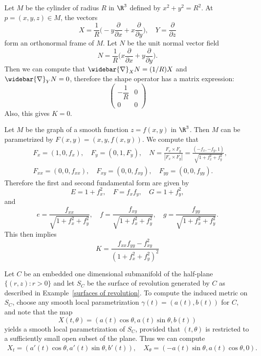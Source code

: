 \begin{example}
Let $M$ be the cylinder of radius $R$ in $\R^3$ defined by $x^2+y^2=R^2$. At $p=(x,y,z)\in M$, the vectors
\[X=\frac{1}{R}\Big(-y\frac{\partial}{\partial x}+x\frac{\partial}{\partial y}\Big),\quad Y=\frac{\partial}{\partial z}\]
form an orthonormal frame of $M$. Let $N$ be the unit normal vector field 
\[N=\frac{1}{R}\Big(x\frac{\partial}{\partial x}+y\frac{\partial}{\partial y}\Big).\]
Then we can compute that $\widebar{\nabla}_XN=(1/R)X$ and $\widebar{\nabla}_YN=0$, therefore the shape operator has a matrix expression:
\[\begin{pmatrix}
-\dfrac{1}{R}&0\\[4pt]
0&0
\end{pmatrix}\]
Also, this gives $K=0$.
\end{example}
\begin{example}
Let $M$ be the graph of a smooth function $z=f(x,y)$ in $\R^3$. Then $M$ can be parametrized by $F(x,y)=(x,y,f(x,y))$. We compute that
\begin{align*}
&F_{x}=(1,0,f_x),\quad F_y=(0,1,F_y),\quad N=\frac{F_x\times F_y}{|F_x\times F_y|}=\frac{(-f_x,-f_y,1)}{\sqrt{1+f_x^2+f_y^2}},\\
&F_{xx}=(0,0,f_{xx}),\quad F_{xy}=(0,0,f_{xy}),\quad F_{yy}=(0,0,f_{yy}).
\end{align*}
Therefore the first and second fundamental form are given by
\[E=1+f_x^2,\quad F=f_xf_y,\quad G=1+f_y^2,\]
and
\[e=\frac{f_{xx}}{\sqrt{1+f_x^2+f_y^2}},\quad f=\frac{f_{xy}}{\sqrt{1+f_x^2+f_y^2}},\quad g=\frac{f_{yy}}{\sqrt{1+f_x^2+f_y^2}}.\]
This then implies
\[K=\frac{f_{xx}f_{yy}-f_{xy}^2}{(1+f_x^2+f_y^2)^2}\]
\end{example}
\begin{example}
Let $C$ be an embedded one dimensional submanifold of the half-plane $\{(r,z):r>0\}$ and let $S_C$ be the surface of revolution generated by $C$ as described in Example~\ref{surfaces of revolution}. To compute the induced metric on $S_C$, choose any smooth local parametrization $\gamma(t)=(a(t),b(t))$ for $C$, and note that 
the map 
\[X(t,\theta)=(a(t)\cos\theta,a(t)\sin\theta,b(t))\]
yields a smooth local parametrization of $S_C$, provided that $(t,\theta)$ is restricted to a sufficiently small open subset of the plane. Thus we can compute
\begin{align*}
X_t=(a'(t)\cos\theta,a'(t)\sin\theta,b'(t)),\quad X_{\theta}=(-a(t)\sin\theta,a(t)\cos\theta,0).
\end{align*}
\end{example}
